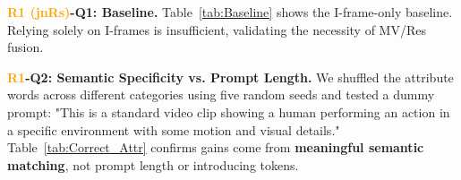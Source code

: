 \documentclass[10pt,twocolumn,letterpaper]{article}
\begin{document}

\thispagestyle{empty}
\appendix



\noindent\textbf{\textcolor{orange}{R1 (jnRs)}-Q1: Baseline.} Table~\ref{tab:Baseline} shows the I-frame-only baseline. Relying solely on I-frames is insufficient, validating the necessity of MV/Res fusion.
\vspace{-10pt}
\begin{table}[h]
\centering\tiny{}
\vspace{-8pt}
\caption{I-frame vs. compressed-domain modalities.}
\label{tab:Baseline}
\end{table}
\vspace{1pt}

\noindent\textbf{\textcolor{orange}{R1}-Q2: Semantic Specificity vs. Prompt Length.} We shuffled the attribute words across different categories using five random seeds and tested a dummy prompt: "This is a standard video clip showing a human performing an action in a specific environment with some motion and visual details." Table~\ref{tab:Correct_Attr} confirms gains come from \textbf{meaningful semantic matching}, not prompt length or introducing tokens.
\end{document}
